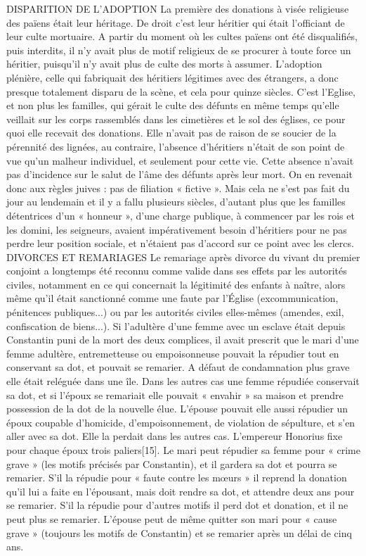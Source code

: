 DISPARITION DE L'ADOPTION
 La première des donations à visée religieuse des païens était leur héritage. De droit c'est leur héritier qui était l'officiant de leur culte mortuaire. A partir du moment où les cultes païens ont été disqualifiés, puis interdits, il n'y avait plus de motif religieux de se procurer à toute force un héritier, puisqu'il n'y avait plus de culte des morts à assumer. L'adoption plénière, celle qui fabriquait des héritiers légitimes avec des étrangers, a donc presque totalement disparu de la scène, et cela pour quinze siècles. C'est l'Eglise, et non plus les familles, qui gérait le culte des défunts en même temps qu'elle veillait sur les corps rassemblés dans les cimetières et le sol des églises, ce pour quoi elle recevait des donations. Elle n'avait pas de raison de se soucier de la pérennité des lignées, au contraire, l'absence d'héritiers n'était de son point de vue qu'un malheur individuel, et seulement pour cette vie. Cette absence n'avait pas d'incidence sur le salut de l'âme des défunts après leur mort. On en revenait donc aux règles juives : pas de filiation « fictive ». Mais cela ne s'est pas fait du jour au lendemain et il y a fallu plusieurs siècles, d'autant plus que les familles détentrices d'un « honneur », d'une charge publique, à commencer par les rois et les domini, les seigneurs, avaient impérativement besoin d'héritiers pour ne pas perdre leur position sociale, et n'étaient pas d'accord sur ce point avec les clercs. 
DIVORCES ET REMARIAGES
 Le remariage après divorce du vivant du premier conjoint a longtemps été reconnu comme valide dans ses effets par les autorités civiles, notamment en ce qui concernait la légitimité des enfants à naître, alors même qu'il était sanctionné comme une faute par l'Église (excommunication, pénitences publiques...) ou par les autorités civiles elles-mêmes (amendes, exil, confiscation de biens...). 
 Si l'adultère d'une femme avec un esclave était depuis Constantin puni de la mort des deux complices, il avait prescrit que le mari d'une femme adultère, entremetteuse ou empoisonneuse pouvait la répudier tout en conservant sa dot, et pouvait se remarier. A défaut de condamnation plus grave elle était reléguée dans une île. Dans les autres cas une femme répudiée conservait sa dot, et si l'époux se remariait elle pouvait « envahir » sa maison et prendre possession de la dot de la nouvelle élue. L'épouse pouvait elle aussi répudier un époux coupable d'homicide, d'empoisonnement, de violation de sépulture, et s'en aller avec sa dot. Elle la perdait dans les autres cas. 
 L'empereur Honorius fixe pour chaque époux trois paliers[15]. Le mari peut répudier sa femme pour « crime grave » (les motifs précisés par Constantin), et il gardera sa dot et pourra se remarier. S'il la répudie pour « faute contre les mœurs » il reprend la donation qu'il lui a faite en l'épousant, mais doit rendre sa dot, et attendre deux ans pour se remarier. S'il la répudie pour d'autres motifs il perd dot et donation, et il ne peut plus se remarier. L'épouse peut de même quitter son mari pour « cause grave » (toujours les motifs de Constantin) et se remarier après un délai de cinq ans.
